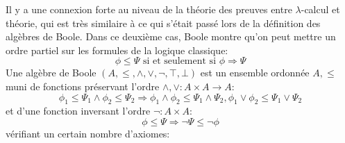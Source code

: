 \documentclass[math, info]{cours}
\begin{document}
Il y a une connexion forte au niveau de la théorie des preuves entre $\lambda$-calcul et théorie, qui est très similaire à ce qui s'était passé lors de la définition des algèbres de Boole.
Dans ce deuxième cas, Boole montre qu'on peut mettre un ordre partiel sur les formules de la logique classique:
\begin{equation*}
	\phi \leq \Psi \text{ si et seulement si } \phi \Rightarrow \Psi
\end{equation*}
Une algèbre de Boole $(A, \leq, \land, \lor, \lnot, \top, \bot)$ est un ensemble ordonnée $A, \leq$ muni de fonctions préservant l'ordre $\land, \lor: A\times A \to A$:
\begin{equation*}
	\phi_{1} \leq \Psi_{1} \land \phi_{2} \leq \Psi_{2} \Longrightarrow \phi_{1} \land \phi_{2} \leq \Psi_{1}\land \Psi_{2}, \phi_{1} \lor \phi_{2} \leq \Psi_{1}\lor \Psi_{2}
\end{equation*}
et d'une fonction inversant l'ordre $\lnot: A \times A$:
\begin{equation*}
	\phi \leq \Psi \Rightarrow \lnot \Psi \leq \lnot \phi
\end{equation*}
vérifiant un certain nombre d'axiomes:
\end{document}
